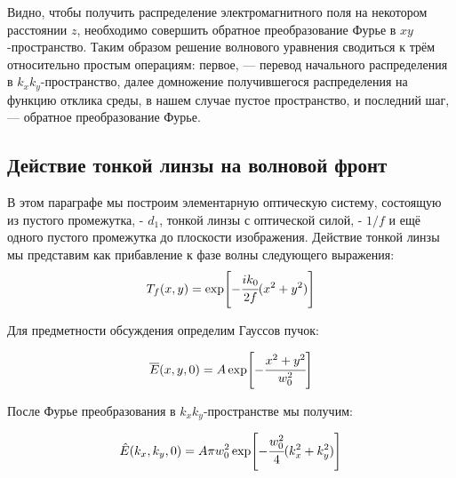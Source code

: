 \documentclass[14pt,a4paper]{extarticle}
\numberwithin{equation}{section}
\begin{document}
Видно, чтобы получить распределение электромагнитного поля на некотором расстоянии $z$, необходимо совершить обратное преобразование Фурье в $xy$-пространство. Таким образом решение волнового уравнения сводиться к трём относительно простым операциям: первое, --- перевод начального распределения в $k_xk_y$-пространство, далее домножение получившегося распределения на функцию отклика среды, в нашем случае пустое пространство, и последний шаг, --- обратное преобразование Фурье. 

\subsection{Действие тонкой линзы на волновой фронт}
В этом параграфе мы построим элементарную оптическую систему, состоящую из пустого промежутка, - $d_1$, тонкой линзы с оптической силой, - $1/f$ и ещё одного пустого промежутка до плоскости изображения. Действие тонкой линзы мы представим как прибавление к фазе волны следующего выражения: 
\begin{equation}
	T_f(x, y) = \exp[-\cfrac{ik_0}{2f}(x^2 + y^2)]
\end{equation}

Для предметности обсуждения определим Гауссов пучок: 

\begin{equation}
	\overline{E}(x, y, 0) = A\exp[-\cfrac{x^2 + y^2}{w^2_0}]
\end{equation}

После Фурье преобразования в $k_xk_y$-пространстве мы получим:

\begin{equation}
	\hat{E}(k_x, k_y, 0) = A\pi w^2_0\exp[-\cfrac{w^2_0}{4}(k_x^2 + k_y^2)]
\end{equation}
\end{document}
